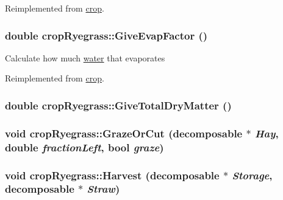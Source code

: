 Reimplemented from \hyperlink{classcrop_a8442897ed98c68b6821a17ce3adc38e8}{crop}.\hypertarget{classcrop_ryegrass_a8c82f3380064d4351d60aada56820cf4}{
\subsubsection[{GiveEvapFactor}]{\setlength{\rightskip}{0pt plus 5cm}double cropRyegrass::GiveEvapFactor ()}}
\label{classcrop_ryegrass_a8c82f3380064d4351d60aada56820cf4}
Calculate how much \hyperlink{classwater}{water} that evaporates 

Reimplemented from \hyperlink{classcrop_aac8ad06adb13f585cfde7cd3f2661618}{crop}.\hypertarget{classcrop_ryegrass_a1e6a5963c054701247f58d1d44972212}{
\subsubsection[{GiveTotalDryMatter}]{\setlength{\rightskip}{0pt plus 5cm}double cropRyegrass::GiveTotalDryMatter ()}}
\label{classcrop_ryegrass_a1e6a5963c054701247f58d1d44972212}
\hypertarget{classcrop_ryegrass_ad72a3a888551fd165455cf75bd59cbf1}{
\subsubsection[{GrazeOrCut}]{\setlength{\rightskip}{0pt plus 5cm}void cropRyegrass::GrazeOrCut ({\bf decomposable} $\ast$ {\em Hay}, \/  double {\em fractionLeft}, \/  bool {\em graze})}}
\label{classcrop_ryegrass_ad72a3a888551fd165455cf75bd59cbf1}
\hypertarget{classcrop_ryegrass_a33a0c70645ce03afc49541e8d3f4919b}{
\subsubsection[{Harvest}]{\setlength{\rightskip}{0pt plus 5cm}void cropRyegrass::Harvest ({\bf decomposable} $\ast$ {\em Storage}, \/  {\bf decomposable} $\ast$ {\em Straw})}}
\label{classcrop_ryegrass_a33a0c70645ce03afc49541e8d3f4919b}


